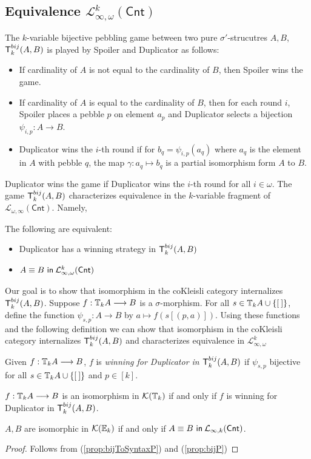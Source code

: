 \subsection{Equivalence $\mathcal{L}^{k}_{\infty,\omega}(\mathsf{Cnt})$}
The $k$-variable bijective pebbling game between two pure $\sigma'$-strucutres $A,B$, ${\mathsf{T}^{bij}_{k}(A,B)}$ is played by Spoiler and Duplicator as follows:
\begin{itemize}
\item If cardinality of $A$ is not equal to the cardinality of $B$, then Spoiler wins the game.
\item If cardinality of $A$ is equal to the cardinality of $B$, then for each round $i$, Spoiler places a pebble $p$ on element $a_{p}$ and Duplicator selects a bijection $\psi_{i,p}:A \longrightarrow B$. 
\item Duplicator wins the $i$-th round if for $b_{q} = \psi_{i,p}(a_{q})$ where $a_{q}$ is the element in $A$ with pebble $q$, the map $\gamma:a_{q} \mapsto b_{q}$ is a partial isomorphism form $A$ to $B$. 
\end{itemize}
Duplicator wins the game if Duplicator wins the $i$-th round for all $i \in \omega$. The game ${\mathsf{T}^{bij}_{k}(A,B)}$ characterizes equivalence in the $k$-variable fragment of $\mathcal{L}_{\omega,\infty}(\mathsf{Cnt})$. Namely,
\begin{prop}
The following are equivalent:
\begin{itemize}
\item Duplicator has a winning strategy in ${\mathsf{T}^{bij}_{k}(A,B)}$
\item ${A \equiv B \ \mathsf{in}\: \mathcal{L}^{k}_{\infty,\omega}(\mathsf{Cnt})}$
\end{itemize}
\label{prop:bijToSyntaxP}
\end{prop}
Our goal is to show that isomorphism in the coKleisli category internalizes ${\mathsf{T}^{bij}_{k}(A,B)}$. Suppose $f:{\mathbb{T}_{k}A} \longrightarrow B$ is a $\sigma$-morphism. For all $s \in {\mathbb{T}_{k}A} \cup \{{[\:]}\}$, define the function $\psi_{s,p}:A \longrightarrow B$ by $a \mapsto f(s[(p,a)])$. Using these functions and the following definition we can show that isomorphism in the coKleisli category internalizes ${\mathsf{T}^{bij}_{k}(A,B)}$ and characterizes equivalence in $\mathcal{L}^{k}_{\infty,\omega}$   
\begin{defn}
Given $f:{\mathbb{T}_{k}A} \longrightarrow B$, $f$ is \textit{winning for Duplicator in ${\mathsf{T}^{bij}_{k}(A,B)}$} if $\psi_{s,p}$ bijective for all $s \in {\mathbb{T}_{k}A} \cup \{{[\:]}\}$ and $p \in [k]$.  
\end{defn}
\begin{prop}
$f:{\mathbb{T}_{k}A} \longrightarrow B$ is an isomorphism in $\mathcal{K}({\mathbb{T}_{k}})$ if and only if $f$ is winning for Duplicator in ${\mathsf{T}^{bij}_{k}(A,B)}$.
\begin{cor}
$A,B$ are isomorphic in $\mathcal{K}({\mathbb{E}_{k}})$ if and only if ${A \equiv B \ \mathsf{in}\: \mathcal{L}_{\infty,k}(\mathsf{Cnt})}$.
\begin{proof}
Follows from (\ref{prop:bijToSyntaxP}) and (\ref{prop:bijP})
\end{proof}
\end{cor}
\label{prop:bijP}
\end{prop}
